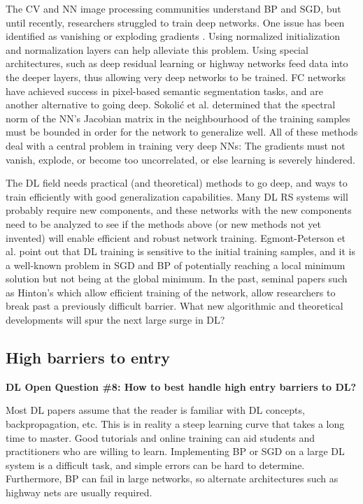 \documentclass[12pt]{spieman}
\begin{document}
\begin{spacing}{1}
The CV and NN image processing communities understand BP and SGD, but until recently, researchers struggled to train deep networks. One issue has been identified as vanishing or exploding gradients \cite{bengio1994learning, glorot2010understanding} . Using normalized initialization and normalization layers can help alleviate this problem. Using special architectures, such as deep residual learning \cite{he2016deep} or highway networks \cite{srivastava2015training} feed data into the deeper layers, thus allowing very deep networks to be trained. FC networks \cite{long2015fully} have achieved success in pixel-based semantic segmentation tasks, and are another alternative to going deep. Sokoli\'{c} et al. \cite{sokolic2016robust} determined that the spectral norm of the NN's Jacobian matrix in the neighbourhood of the training samples must be bounded in order for the network to generalize well. All of these methods deal with a central problem in training very deep NNs: The gradients must not vanish, explode, or become too uncorrelated, or else learning is severely hindered.

The DL field needs practical (and theoretical) methods to go deep, and ways to train efficiently with good generalization capabilities. Many DL RS systems will probably require new components, and these networks with the new components need to be analyzed to see if the methods above (or new methods not yet invented) will enable efficient and robust network training. Egmont-Peterson et al. \cite{Egmont-Petersen2002} point out that DL training is sensitive to the initial training samples, and it is a well-known problem in SGD and BP of potentially reaching a local minimum solution but not being at the global minimum. In the past, seminal papers such as Hinton's \cite{hinton2006fast} which allow efficient training of the network, allow researchers to break past a previously difficult barrier. What new algorithmic and theoretical developments will spur the next large surge in DL?

\subsection{High barriers to entry}
\label{subsec:ChallengesOpportunities_viii}
\textbf{DL Open Question \#8: How to best handle high entry barriers to DL?}

Most DL papers assume that the reader is familiar with DL concepts, backpropagation, etc. This is in reality a steep learning curve that takes a long time to master. Good tutorials and online training can aid students and practitioners who are willing to learn. Implementing BP or SGD on a large DL system is a difficult task, and simple errors can be hard to determine. Furthermore, BP can fail in large networks, so alternate architectures such as highway nets are usually required.


\end{spacing}
\end{document}
